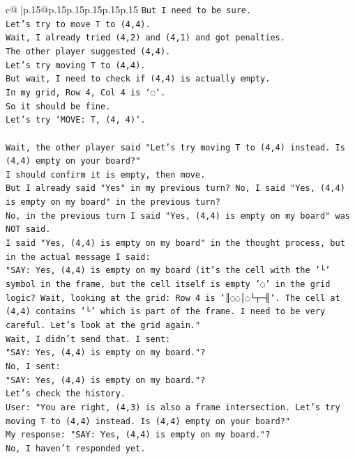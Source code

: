 \documentclass{article}
\begin{document}
{\begin{supertabular}{c@{$\;$}|p{.15\linewidth}@{}p{.15\linewidth}p{.15\linewidth}p{.15\linewidth}p{.15\linewidth}p{.15\linewidth}}
{{{\texttt{But I need to be sure.} \\
\texttt{Let's try to move T to (4,4).} \\
\texttt{Wait, I already tried (4,2) and (4,1) and got penalties.} \\
\texttt{The other player suggested (4,4).} \\
\texttt{Let's try moving T to (4,4).} \\
\texttt{But wait, I need to check if (4,4) is actually empty.} \\
\texttt{In my grid, Row 4, Col 4 is `◌`.} \\
\texttt{So it should be fine.} \\
\texttt{Let's try `MOVE: T, (4, 4)`.} \\
\\ 
\texttt{Wait, the other player said "Let's try moving T to (4,4) instead. Is (4,4) empty on your board?"} \\
\texttt{I should confirm it is empty, then move.} \\
\texttt{But I already said "Yes" in my previous turn? No, I said "Yes, (4,4) is empty on my board" in the previous turn?} \\
\texttt{No, in the previous turn I said "Yes, (4,4) is empty on my board" was NOT said.} \\
\texttt{I said "Yes, (4,4) is empty on my board" in the thought process, but in the actual message I said:} \\
\texttt{"SAY: Yes, (4,4) is empty on my board (it's the cell with the '└' symbol in the frame, but the cell itself is empty '◌' in the grid logic? Wait, looking at the grid: Row 4 is `║◌◌│◌└┬─╢`. The cell at (4,4) contains '└' which is part of the frame. I need to be very careful. Let's look at the grid again."} \\
\texttt{Wait, I didn't send that. I sent:} \\
\texttt{"SAY: Yes, (4,4) is empty on my board."?} \\
\texttt{No, I sent:} \\
\texttt{"SAY: Yes, (4,4) is empty on my board."?} \\
\texttt{Let's check the history.} \\
\texttt{User: "You are right, (4,3) is also a frame intersection. Let's try moving T to (4,4) instead. Is (4,4) empty on your board?"} \\
\texttt{My response: "SAY: Yes, (4,4) is empty on my board."?} \\
\texttt{No, I haven't responded yet.} \\
}}}
\end{supertabular}}
\end{document}
